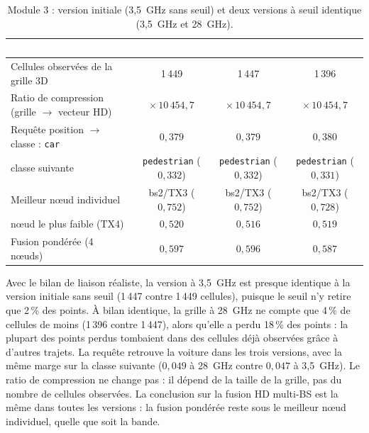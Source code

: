 \documentclass[12pt,a4paper,titlepage]{article}
\newcommand{\hd}[1]{\textcolor{white}{\textbf{#1}}}
\begin{document}
\begin{table}[H]
    \centering
    \caption{Module 3 : version initiale (3,5~GHz sans seuil) et deux versions à seuil identique (3,5~GHz et 28~GHz).}
    \label{tab:hd_compare}
    \begin{tabularx}{\textwidth}{F{4.6cm}CCC}
        \toprule
        \hd{Indicateur} & \hd{} & \hd{} & \hd{} \\
        \midrule
        Cellules observées de la grille 3D & 1\,449 & 1\,447 & 1\,396 \\
        Ratio de compression (grille $\to$ vecteur HD) & $\times\,10\,454{,}7$ & $\times\,10\,454{,}7$ & $\times\,10\,454{,}7$ \\
        Requête position $\to$ classe : \texttt{car} & $0{,}379$ & $0{,}379$ & $0{,}380$ \\
        \quad classe suivante & \texttt{pedestrian} ($0{,}332$) & \texttt{pedestrian} ($0{,}332$) & \texttt{pedestrian} ($0{,}331$) \\
        Meilleur n\oe ud individuel & bs2/TX3 ($0{,}752$) & bs2/TX3 ($0{,}752$) & bs2/TX3 ($0{,}728$) \\
        n\oe ud le plus faible (TX4) & $0{,}520$ & $0{,}516$ & $0{,}519$ \\
        Fusion pondérée (4 n\oe uds) & $0{,}597$ & $0{,}596$ & $0{,}587$ \\
        \bottomrule
    \end{tabularx}
\end{table}

Avec le bilan de liaison réaliste, la version à 3,5~GHz est presque identique à la version initiale sans seuil (1\,447 contre 1\,449 cellules), puisque le seuil n'y retire que 2\,\% des points. À bilan identique, la grille à 28~GHz ne compte que 4\,\% de cellules de moins (1\,396 contre 1\,447), alors qu'elle a perdu 18\,\% des points : la plupart des points perdus tombaient dans des cellules déjà observées grâce à d'autres trajets. La requête retrouve la voiture dans les trois versions, avec la même marge sur la classe suivante ($0{,}049$ à 28~GHz contre $0{,}047$ à 3,5~GHz). Le ratio de compression ne change pas : il dépend de la taille de la grille, pas du nombre de cellules observées. La conclusion sur la fusion HD multi-BS est la même dans toutes les versions : la fusion pondérée reste sous le meilleur n\oe ud individuel, quelle que soit la bande.
\end{document}
